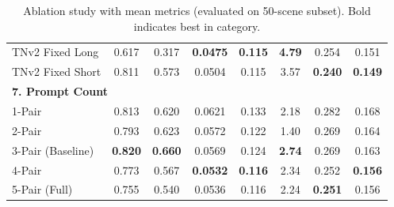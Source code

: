 \begin{table}[t]
\begin{tabular}{@{} l c c c c c c c @{}}
\hspace{3mm} TNv2 Fixed Long & 0.617 & 0.317 & \textbf{0.0475} & \textbf{0.115} & \textbf{4.79} & 0.254 & 0.151 \\
\hspace{3mm} TNv2 Fixed Short & 0.811 & 0.573 & 0.0504 & 0.115 & 3.57 & \textbf{0.240} & \textbf{0.149} \\
\midrule
\multicolumn{8}{l}{\textbf{7. Prompt Count}} \\
\hspace{3mm} 1-Pair & 0.813 & 0.620 & 0.0621 & 0.133 & 2.18 & 0.282 & 0.168 \\
\hspace{3mm} 2-Pair & 0.793 & 0.623 & 0.0572 & 0.122 & 1.40 & 0.269 & 0.164 \\
\rowcolor{gray!15} \hspace{3mm} 3-Pair (Baseline) & \textbf{0.820} & \textbf{0.660} & 0.0569 & 0.124 & \textbf{2.74} & 0.269 & 0.163 \\
\hspace{3mm} 4-Pair & 0.773 & 0.567 & \textbf{0.0532} & \textbf{0.116} & 2.34 & 0.252 & \textbf{0.156} \\
\hspace{3mm} 5-Pair (Full) & 0.755 & 0.540 & 0.0536 & 0.116 & 2.24 & \textbf{0.251} & 0.156 \\
\bottomrule
\end{tabular}
\caption{Ablation study with mean metrics (evaluated on 50-scene subset). Bold indicates best in category.}
\label{tab:ablation_results}
\end{table}
